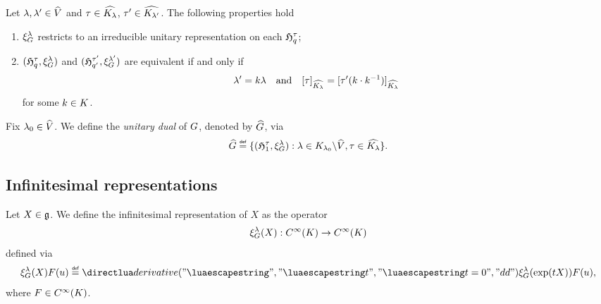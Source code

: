 \begin{proposition}
\label{proposition:unitary_dual}
    Let $\lambda, \lambda' \in {\widehat{V}}$
    and $\tau \in {\widehat{{{K}_{\lambda}}}}$,
    $\tau' \in {\widehat{{{K}_{\lambda'}}}}$.
    The following properties hold
    \begin{enumerate}
        \item $\xi^{\lambda}_G$ restricts to an irreducible unitary representation on each ${\mathfrak{H}^{\tau}_{q}}$;
        \item $({\mathfrak{H}^{\tau}_{q}}, \xi^{\lambda}_G)$ and $({\mathfrak{H}^{\tau'}_{q'}}, \xi^{\lambda'}_G)$ are equivalent if and only if
            \begin{align*}
                \lambda' = k \lambda \quad \text{and} \quad {{[\tau]}_{{\widehat{{{K}_{\lambda}}}}}} = {{[\tau'(k \cdot k^{-1})]}_{{\widehat{{{K}_{\lambda}}}}}}
            \end{align*}
            for some $k \in K$.
    \end{enumerate}
\end{proposition}

\begin{definition}
\label{definition:unitary_dual}
    Fix $\lambda_0 \in {\widehat{V}}$.
    We define the \emph{unitary dual} of $G$, denoted by ${\widehat{G}}$, via
    \begin{align*}
        \dualGroup{\Group} \defeq \{ (\Hilbert{\tau}{1}, \Rep{\lambda}) : \lambda \in \LeftQuotient{\IsotropySubgroup{\CompactGroup}{\lambda_0}}{\dualGroup{\VectorSpace}}, \tau \in \dualGroup{\IsotropySubgroup{\CompactGroup}{\lambda}} \}.
    \end{align*}
\end{definition}

\subsection{Infinitesimal representations}

\begin{definition}
\label{definition:infinitesimal_representation}
    Let $X \in \mathfrak{g}$.
    We define the infinitesimal representation of $X$ as the operator
    \begin{align*}
        \xi^{\lambda}_G(X) : {C^\infty(K)} \to {C^\infty(K)}
    \end{align*}
    defined via
    \begin{align*}
        \Rep{\lambda}(X) F(u) \defeq \D*{t}<t=0> \Rep{\lambda}(\exp(t X)) F(u),
    \end{align*}
    where $F \in {C^\infty(K)}$.
\end{definition}

